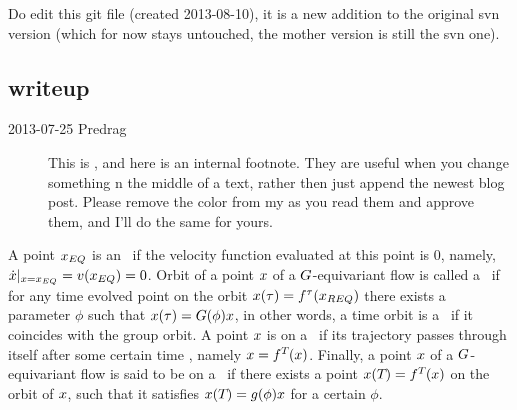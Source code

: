 

\noindent
{\color{red} Do edit this git file (created 2013-08-10),
it is a new addition to the original svn version (which for now
stays untouched, the mother version is still the svn one).
}
\bigskip\bigskip

\subsection{{\twoMode} writeup}
\label{chap:2modesBBproj}

\begin{description}

\item[2013-07-25  Predrag] This is ,
and here is an internal footnote. They
are useful when you change something n the middle of a text, rather then
just append the newest blog post. Please remove the color from my
 as you read them and approve them, and I'll do the same
for yours.



\end{description}

                     \toCB
A point $x_{EQ}$ is an \eqv\ if the velocity function evaluated at this
point is 0, namely, $\dot{x}|_{x=x_{EQ}} = v({x_{EQ}}) = 0$.
Orbit of
a point $x$ of a $G$-equivariant flow is called a \reqv\ if for any
time evolved point on the orbit $x(\tau) = f^{\tau}(x_{REQ})$ there
exists a parameter $\phi$ such that $x(\tau) = G(\phi) x$, in other
words, a time orbit is a \reqv\ if it coincides with the group orbit.
 A
point $x$ is on a \po\ if its trajectory passes through itself after some
certain time \period{}, namely $x = f^{{T_{}}}(x)$. Finally, a point $x$ of a
$G$-equivariant flow is said to be on a \rpo\ if there exists a
point $x({T_{}}) = f^{T_{}}(x)$ on the orbit of $x$, such that it satisfies $x({T_{}}) =
g(\phi) x$ for a certain $\phi$.

